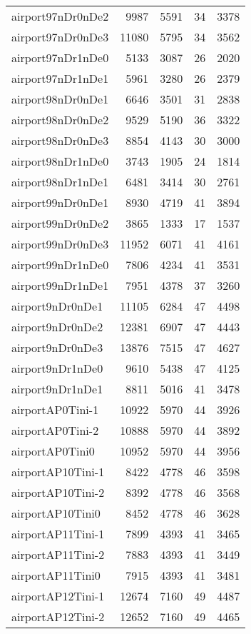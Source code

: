 \begin{longtable}{lrrrr}
airport97nDr0nDe2 & 9987 & 5591 & 34 & 3378 \\
airport97nDr0nDe3 & 11080 & 5795 & 34 & 3562 \\
airport97nDr1nDe0 & 5133 & 3087 & 26 & 2020 \\
airport97nDr1nDe1 & 5961 & 3280 & 26 & 2379 \\
airport98nDr0nDe1 & 6646 & 3501 & 31 & 2838 \\
airport98nDr0nDe2 & 9529 & 5190 & 36 & 3322 \\
airport98nDr0nDe3 & 8854 & 4143 & 30 & 3000 \\
airport98nDr1nDe0 & 3743 & 1905 & 24 & 1814 \\
airport98nDr1nDe1 & 6481 & 3414 & 30 & 2761 \\
airport99nDr0nDe1 & 8930 & 4719 & 41 & 3894 \\
airport99nDr0nDe2 & 3865 & 1333 & 17 & 1537 \\
airport99nDr0nDe3 & 11952 & 6071 & 41 & 4161 \\
airport99nDr1nDe0 & 7806 & 4234 & 41 & 3531 \\
airport99nDr1nDe1 & 7951 & 4378 & 37 & 3260 \\
airport9nDr0nDe1 & 11105 & 6284 & 47 & 4498 \\
airport9nDr0nDe2 & 12381 & 6907 & 47 & 4443 \\
airport9nDr0nDe3 & 13876 & 7515 & 47 & 4627 \\
airport9nDr1nDe0 & 9610 & 5438 & 47 & 4125 \\
airport9nDr1nDe1 & 8811 & 5016 & 41 & 3478 \\
airportAP0Tini-1 & 10922 & 5970 & 44 & 3926 \\
airportAP0Tini-2 & 10888 & 5970 & 44 & 3892 \\
airportAP0Tini0 & 10952 & 5970 & 44 & 3956 \\
airportAP10Tini-1 & 8422 & 4778 & 46 & 3598 \\
airportAP10Tini-2 & 8392 & 4778 & 46 & 3568 \\
airportAP10Tini0 & 8452 & 4778 & 46 & 3628 \\
airportAP11Tini-1 & 7899 & 4393 & 41 & 3465 \\
airportAP11Tini-2 & 7883 & 4393 & 41 & 3449 \\
airportAP11Tini0 & 7915 & 4393 & 41 & 3481 \\
airportAP12Tini-1 & 12674 & 7160 & 49 & 4487 \\
airportAP12Tini-2 & 12652 & 7160 & 49 & 4465 \\

\end{longtable}

